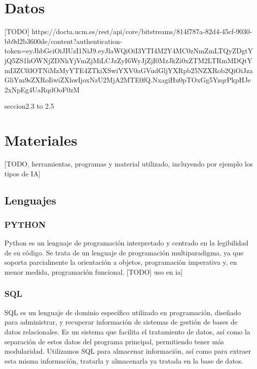 

\section{Datos} \label{sec:Materiales_datos}

[TODO]
https://docta.ucm.es/rest/api/core/bitstreams/814f787a-82d4-45cf-9030-bb9d2b3600de/content?authentication-token=eyJhbGciOiJIUzI1NiJ9.eyJlaWQiOiI3YTI4M2Y4MC0zNmZmLTQyZDgtYjQ5ZS1hOWNjZDNhYjVmZjMiLCJzZyI6WyJjZjI0MzJkZi0xZTM2LTRmMDQtYmI3ZC03OTNiMzMyYTE4ZTkiXSwiYXV0aGVudGljYXRpb25NZXRob2QiOiJzaGliYm9sZXRoIiwiZXhwIjoxNzU2MjA2MTE0fQ.NxagiHu0pTOxGg5YzqrPkpHJe2xNpEg4UaRqdOoF0zM

seccion2.3 to 2.5

\section{Materiales}

[TODO, herramientas, programas y material utilizado, incluyendo por ejemplo los tipos de IA]

\subsection{Lenguajes} 

\subsubsection*{PYTHON}
Python es un lenguaje de programación interpretado y centrado en la legibilidad de su código. Se trata de un lenguaje de programación multiparadigma, ya que soporta parcialmente la orientación a objetos, programación imperativa y, en menor medida, programación funcional. [TODO] uso en ia]

\subsubsection*{SQL}
SQL es un lenguaje de dominio específico utilizado en programación, diseñado para administrar, y recuperar información de sistemas de gestión de bases de datos relacionales. Es un sistema que facilita el tratamiento de datos, así como la separación de estos datos del programa principal, permitiendo tener más modularidad.
Utilizamos SQL para almacenar información, así como para extraer esta misma información, tratarla y almacenarla ya tratada en la base de datos. 

